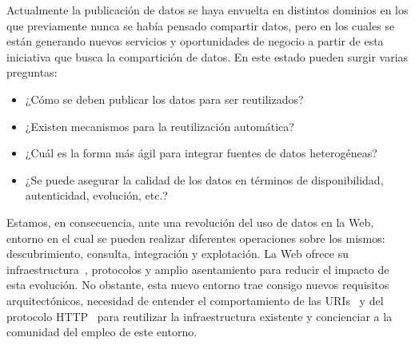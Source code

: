 Actualmente la publicación de datos se haya envuelta en distintos dominios en los que previamente
nunca se había pensado compartir datos, pero en los cuales se están generando nuevos servicios y 
oportunidades de negocio a partir de esta iniciativa que busca la compartición de datos. En 
este estado pueden surgir varias preguntas:
\begin{itemize}
 \item ¿Cómo se deben publicar los datos para ser reutilizados?
\item ¿Existen mecanismos para la reutilización automática?
\item ¿Cuál es la forma más ágil para integrar fuentes de datos heterogéneas?
\item ¿Se puede asegurar la calidad de los datos en términos de disponibilidad, autenticidad, evolución, etc.?
\end{itemize}

Estamos, en consecuencia, ante una revolución del uso de datos en la Web, entorno en el cual se pueden realizar
diferentes operaciones sobre los mismos: descubrimiento, consulta, integración y explotación. La Web ofrece
su infraestructura~\cite{webarch}, protocolos y amplio asentamiento para reducir el impacto de esta evolución. No obstante, esta nuevo 
entorno trae consigo nuevos requisitos arquitectónicos, necesidad de entender el comportamiento de las \gls{URI}s~\cite{uri-rfc} y del 
protocolo \gls{HTTP}~\cite{http-rfc} para reutilizar la infraestructura existente y concienciar a la comunidad del empleo de este entorno. 

